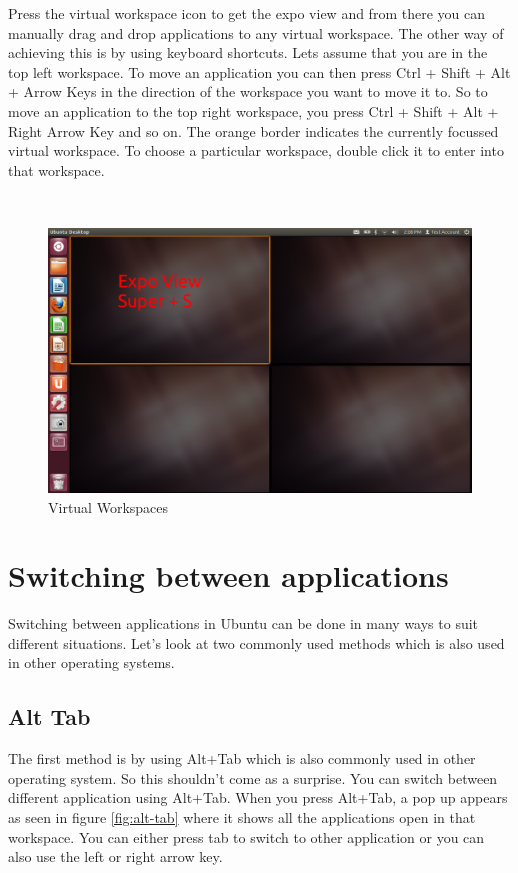 \par \noindent Press the virtual workspace icon to get the expo view and from there you can manually drag and drop applications to any virtual workspace.  The other way of achieving this is by using keyboard shortcuts. Lets assume that you are in the top left workspace. To move an application you can then press Ctrl + Shift + Alt + Arrow Keys in the direction of the workspace you want to move it to. So to move an application to the top right workspace, you press Ctrl + Shift + Alt + Right Arrow Key and so on. The orange border indicates the currently focussed virtual workspace. To choose a particular workspace, double click it to enter into that workspace. \\

\par \noindent {} \\

\begin{figure}[ht!]	
	\centering
	\includegraphics[width=325pt]{./images/work-ubuntu/workspaces.png}
	\caption{Virtual Workspaces}	
	\label{fig:workspaces}		
\end{figure}

\section{Switching between applications} 
Switching between applications in Ubuntu can be done in many ways to suit different situations. Let's look at two commonly used methods which is also used in other operating systems. 

\subsection*{Alt Tab} 
The first method is by using Alt+Tab which is also commonly used in other operating system. So this shouldn't come as a surprise. You can switch between different application using Alt+Tab. When you press Alt+Tab, a pop up appears as seen in figure \ref{fig:alt-tab} where it shows all the applications open in that workspace. You can either press tab to switch to other application or you can also use the left or right arrow key. \\


